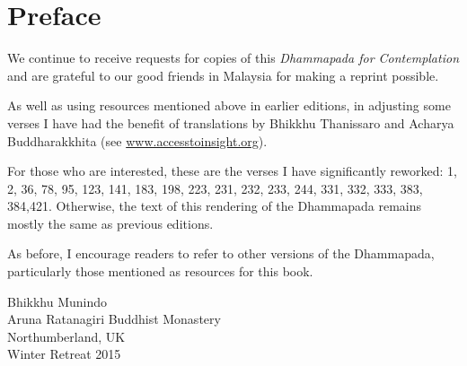 
\chapter[Preface to the fourth edition (2015)]{Preface}

We continue to receive requests for copies of this \emph{Dhammapada for
Contemplation} and are grateful to our good friends in Malaysia for making a
reprint possible.

As well as using resources mentioned above in earlier editions, in adjusting
some verses I have had the benefit of translations by Bhikkhu Thanissaro and
Acharya Buddharakkhita (see
\href{http://accesstoinsight.org}{www.accesstoinsight.org}).

For those who are interested, these are the verses I have significantly
reworked: 1, 2, 36, 78, 95, 123, 141, 183, 198, 223, 231, 232, 233, 244, 331,
332, 333, 383, 384,421. Otherwise, the text of this rendering of the Dhammapada
remains mostly the same as previous editions.

As before, I encourage readers to refer to other versions of the Dhammapada,
particularly those mentioned as resources for this book.

{\raggedleft
Bhikkhu Munindo\\
Aruna Ratanagiri Buddhist Monastery\\
Northumberland, UK\\
Winter Retreat 2015
\par}
